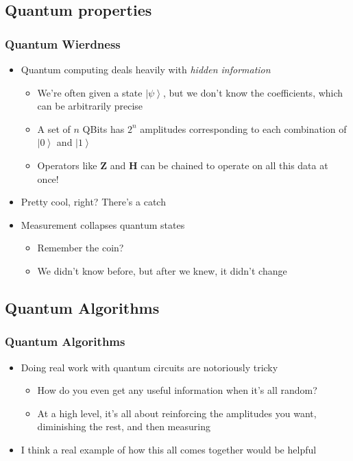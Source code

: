 \documentclass{beamer}
\newcommand{\ket}[1]{\left|{#1}\right\rangle}
\newcommand{\hop}{\textbf{H}}
\newcommand{\zop}{\textbf{Z}}
\newcommand{\zvec}{\ket{0}}
\newcommand{\ovec}{\ket{1}}
\begin{document}
  \subsection{Quantum properties}
  \begin{frame}
    \frametitle{Quantum Wierdness}
    \begin{itemize}
      \item{Quantum computing deals heavily with \textit{hidden information}}
      \begin{itemize}
        \item{We're often given a state $\ket{\psi}$, but we don't know the coefficients, which can be arbitrarily precise}
        \item{A set of $n$ QBits has $2^{n}$ amplitudes corresponding to each combination of $\zvec$ and $\ovec$}
        \item{Operators like $\zop$ and $\hop$ can be chained to operate on all this data at once!}
      \end{itemize}
      \item{Pretty cool, right? There's a catch}
      \item{Measurement collapses quantum states}
      \begin{itemize}
        \item{Remember the coin?}
        \item{We didn't know before, but after we knew, it didn't change}
      \end{itemize}
    \end{itemize}
  \end{frame}

  \subsection{Quantum Algorithms}
  \begin{frame}
    \frametitle{Quantum Algorithms}
    \begin{itemize}
      \item{Doing real work with quantum circuits are notoriously tricky}
      \begin{itemize}
        \item{How do you even get any useful information when it's all random?}
        \item{At a high level, it's all about reinforcing the amplitudes you want,
          diminishing the rest, and then measuring}
      \end{itemize}
      \item{I think a real example of how this all comes together would be helpful}
    \end{itemize}
  \end{frame}
\end{document}
